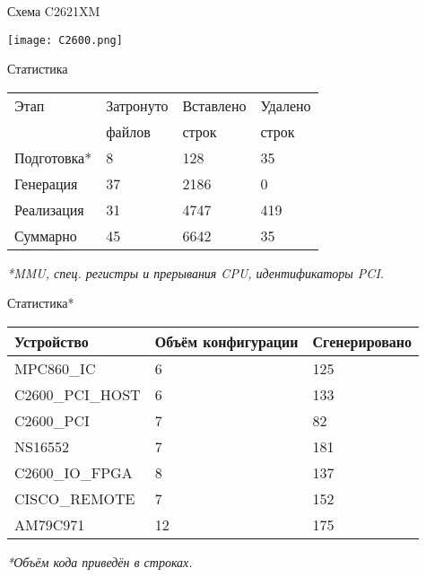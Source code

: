 \documentclass[unicode,hyperref={unicode=true}]{beamer}
\theoremstyle{definition}
\theoremstyle{plain}
\begin{document}
\begin{frame}{Схема C2621XM}
\begin{center}
\texttt{[image: C2600.png]}
\end{center}
\end{frame}



\begin{frame}{Статистика}
\begin{center}
\begin{tabular}{l|lll}
Этап         & Затронуто & Вставлено & Удалено \\
             & файлов    & строк     & строк   \\
\hline
Подготовка*  & 8         & 128       & 35      \\
Генерация    & 37        & 2186      & 0       \\
Реализация   & 31        & 4747      & 419     \\
Суммарно     & 45        & 6642      & 35      \\
\end{tabular}
\end{center}
\vfill
\it{*MMU, спец. регистры и прерывания CPU, идентификаторы PCI.}
\end{frame}



\begin{frame}{Статистика*}
\begin{center}
\begin{tabular}{l|ll}
Устройство        & Объём конфигурации & Сгенерировано \\
\hline
MPC860\_IC        & 6                  & 125           \\
C2600\_PCI\_HOST  & 6                  & 133           \\
C2600\_PCI        & 7                  & 82            \\
NS16552           & 7                  & 181           \\
C2600\_IO\_FPGA   & 8                  & 137           \\
CISCO\_REMOTE     & 7                  & 152           \\
AM79C971          & 12                 & 175           \\
\end{tabular}
\end{center}
\vfill
\it{*Объём кода приведён в строках.}
\end{frame}
\end{document}
